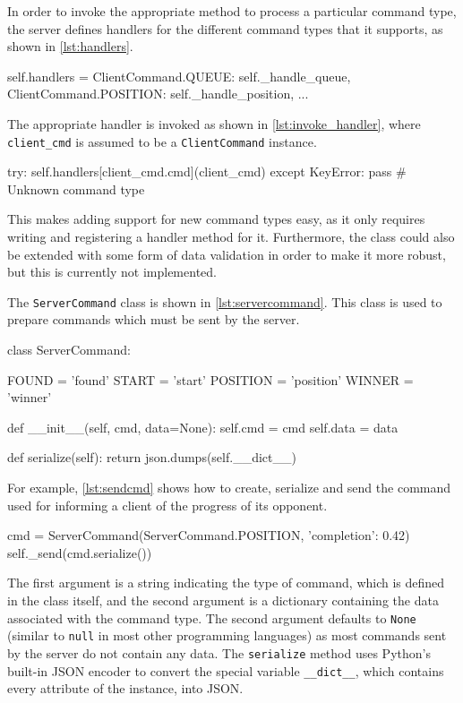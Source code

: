 In order to invoke the appropriate method to process a particular command type, the server defines handlers for the different command types that it supports, as shown in \autoref{lst:handlers}.

\begin{code}[language={Python}, caption={Handlers for Different Command Types}, label={lst:handlers}]
self.handlers = {
		ClientCommand.QUEUE: self._handle_queue,
		ClientCommand.POSITION: self._handle_position,
		...
	}
\end{code}

The appropriate handler is invoked as shown in \autoref{lst:invoke_handler}, where \texttt{client\_cmd} is assumed to be a \texttt{Client\-Command} instance.

\begin{code}[language={Python}, caption={Invoking a Handler Method}, label={lst:invoke_handler}]
try:
	self.handlers[client_cmd.cmd](client_cmd)
except KeyError:
	pass # Unknown command type
\end{code}

This makes adding support for new command types easy, as it only requires writing and registering a handler method for it.
Furthermore, the class could also be extended with some form of data validation in order to make it more robust, but this is currently not implemented.

The \texttt{Server\-Command} class is shown in \autoref{lst:servercommand}.
This class is used to prepare commands which must be sent by the server.

\begin{code}[language={Python}, caption={\texttt{ServerCommand} Class}, label={lst:servercommand}]
class ServerCommand:

	FOUND = 'found'
	START = 'start'
	POSITION = 'position'
	WINNER = 'winner'

	def __init__(self, cmd, data=None):
		self.cmd = cmd
		self.data = data

	def serialize(self):
		return json.dumps(self.__dict__)
\end{code}

For example, \autoref{lst:sendcmd} shows how to create, serialize and send the command used for informing a client of the progress of its opponent.

\begin{code}[language={Python}, caption={Creating and Sending a Command}, label={lst:sendcmd}]
cmd = ServerCommand(ServerCommand.POSITION, {'completion': 0.42})
self._send(cmd.serialize())
\end{code}

The first argument is a string indicating the type of command, which is defined in the class itself, and the second argument is a dictionary containing the data associated with the command type.
The second argument defaults to \texttt{None} (similar to \texttt{null} in most other programming languages) as most commands sent by the server do not contain any data.
The \texttt{serialize} method uses Python's built-in JSON encoder to convert the special variable \texttt{\_\_dict\_\_}, which contains every attribute of the instance, into JSON.
